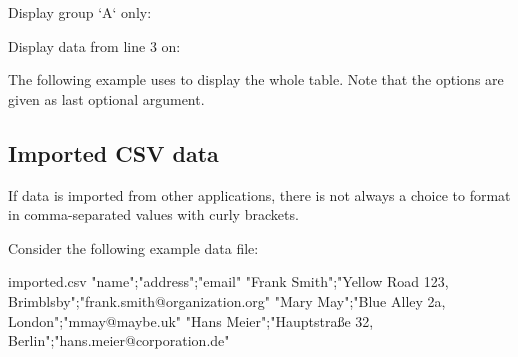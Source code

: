 \documentclass[a4paper,11pt]{ltxdoc}
\begin{document}
\begin{dispExample}
Display group `A` only:\par
{}
\end{dispExample}


\begin{dispExample}
Display data from line 3 on:\par
{}
\end{dispExample}


\clearpage

The following example uses  to display the whole
table. Note that the  options are given as last
optional argument.




\clearpage
\subsection{Imported CSV data}\label{sec:importeddata}%
If data is imported from other applications, there is not always a choice
to format in comma-separated values with curly brackets.

Consider the following example data file:

\begin{tcbverbatimwrite}{imported.csv}
"name";"address";"email"
"Frank Smith";"Yellow Road 123, Brimblsby";"frank.smith@organization.org"
"Mary May";"Blue Alley 2a, London";"mmay@maybe.uk"
"Hans Meier";"Hauptstraße 32, Berlin";"hans.meier@corporation.de"
\end{tcbverbatimwrite}
\end{document}
